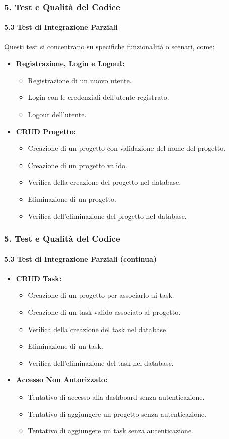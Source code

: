\documentclass{beamer}
\begin{document}
\begin{frame}[fragile]
\frametitle{5. Test e Qualità del Codice}
\framesubtitle{5.3 Test di Integrazione Parziali}
Questi test si concentrano su specifiche funzionalità o scenari, come:

\begin{itemize}
    \item \textbf{Registrazione, Login e Logout:}
    \begin{itemize}
        \item Registrazione di un nuovo utente.
        \item Login con le credenziali dell'utente registrato.
        \item Logout dell'utente.
    \end{itemize}
    
    \item \textbf{CRUD Progetto:}
    \begin{itemize}
        \item Creazione di un progetto con validazione del nome del progetto.
        \item Creazione di un progetto valido.
        \item Verifica della creazione del progetto nel database.
        \item Eliminazione di un progetto.
        \item Verifica dell'eliminazione del progetto nel database.
    \end{itemize}
\end{itemize}
\end{frame}

\begin{frame}[fragile]
\frametitle{5. Test e Qualità del Codice}
\framesubtitle{5.3 Test di Integrazione Parziali (continua)}
\begin{itemize}
    \item \textbf{CRUD Task:}
    \begin{itemize}
        \item Creazione di un progetto per associarlo ai task.
        \item Creazione di un task valido associato al progetto.
        \item Verifica della creazione del task nel database.
        \item Eliminazione di un task.
        \item Verifica dell'eliminazione del task nel database.
    \end{itemize}
    
    \item \textbf{Accesso Non Autorizzato:}
    \begin{itemize}
        \item Tentativo di accesso alla dashboard senza autenticazione.
        \item Tentativo di aggiungere un progetto senza autenticazione.
        \item Tentativo di aggiungere un task senza autenticazione.
    \end{itemize}
\end{itemize}
\end{frame}
\end{document}
